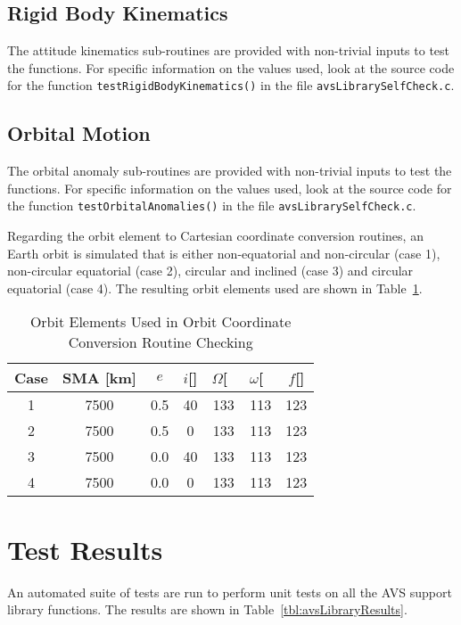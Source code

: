 \subsection{Rigid Body Kinematics}
The attitude kinematics sub-routines are provided with non-trivial inputs to test the functions.   For specific information on the values used, look at the source code for the function {\tt testRigidBodyKinematics()} in the file {\tt avsLibrarySelfCheck.c}.  


\subsection{Orbital Motion}
The orbital anomaly sub-routines are provided with non-trivial inputs to test the functions.   For specific information on the values used, look at the source code for the function {\tt testOrbitalAnomalies()} in the file {\tt avsLibrarySelfCheck.c}.  

Regarding the orbit element to Cartesian coordinate conversion routines, an Earth orbit is simulated that is either non-equatorial and non-circular (case 1), non-circular equatorial (case 2), circular and inclined (case 3) and circular equatorial (case 4).  The resulting orbit elements used are shown in Table~\ref{tbl:orbitValues}.  


\begin{table}[htbp]
	\caption{Orbit Elements Used in Orbit Coordinate Conversion Routine Checking}
	\label{tbl:orbitValues}
	\centering \fontsize{10}{10}\selectfont
	\begin{tabular}{c || c | c | c | c | c | c} %
		\hline 
		\hline 
		Case    & SMA  [km]& $e$ & $i$[\dg] & $\Omega$[\dg\ & $\omega$[\dg\ & $f$[\dg] \\
		\hline 
		  1   &  7500 & 0.5 & 40 & 133 & 113 & 123 \\
		  2   &  7500 & 0.5 & 0 & 133 & 113 & 123 \\
		  3   &  7500 & 0.0 & 40 & 133 & 113 & 123 \\
		  4   &  7500 & 0.0 & 0 & 133 & 113 & 123 \\
		\hline
		\hline
	\end{tabular}
\end{table}





\section{Test Results}
An automated suite of tests are run to perform unit tests on all the AVS support library functions.  The results are shown in Table~\ref{tbl:avsLibraryResults}.  


